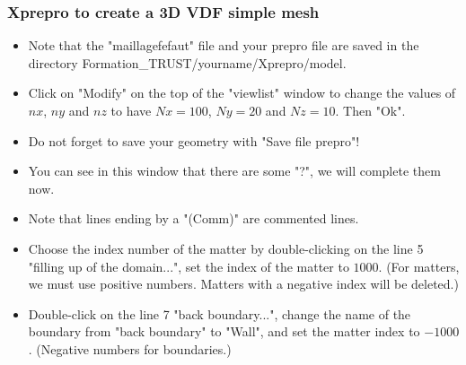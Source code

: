 \documentclass[10pt, hyperref={unicode=true,pdfusetitle, bookmarks=true,bookmarksnumbered=false,bookmarksopen=false, breaklinks=false,pdfborder={0 0 1},backref=true,colorlinks=true,linkcolor=darkblue,pageanchor}]{beamer}
\begin{document}
\begin{frame}
\frametitle{Xprepro to create a 3D VDF simple mesh}
\begin{block}{}

\begin{itemize}
\item Note that the "maillagefefaut" file and your prepro file are saved in the directory Formation\_TRUST/yourname/Xprepro/model.
\item Click on "Modify" on the top of the "viewlist" window to change the values of $nx$, $ny$ and $nz$ to have $Nx=100$, $Ny=20$ and $Nz=10$. Then "Ok". 
\item Do not forget to save your geometry with "Save file prepro"!
\item You can see in this window that there are some "?", we will complete them now.
\item Note that lines ending by a "(Comm)" are commented lines.
\item Choose the index number of the matter by double-clicking on the line 5 "filling up of the domain...", set the index of the matter to $1000$. (For matters, we must use positive numbers. Matters with a negative index will be deleted.)
\item Double-click on the line 7 "back boundary...", change the name of the boundary from "back boundary" to "Wall", and set the matter index to $-1000$. (Negative numbers for boundaries.)
\end{itemize}

\end{block}
\end{frame}
\end{document}
